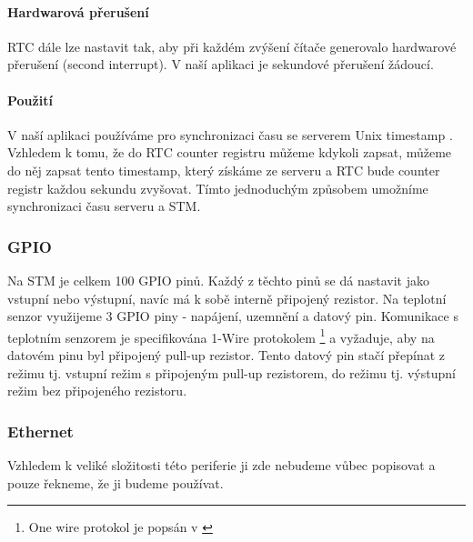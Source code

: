 \paragraph{Hardwarová přerušení}
RTC dále lze nastavit tak, aby při každém zvýšení čítače generovalo hardwarové
přerušení (second interrupt).
V naší aplikaci je sekundové přerušení žádoucí.

\paragraph{Použití}
V naší aplikaci používáme pro synchronizaci času se serverem Unix timestamp \cite{Unix-timestamp}.
Vzhledem k tomu, že do RTC counter registru můžeme kdykoli zapsat, můžeme do něj zapsat tento timestamp, který
získáme ze serveru a RTC bude counter registr každou sekundu zvyšovat.
Tímto jednoduchým způsobem umožníme synchronizaci času serveru a STM.

\subsubsection{GPIO}
Na STM je celkem 100 GPIO pinů.
Každý z těchto pinů se dá nastavit jako vstupní nebo výstupní, navíc má k sobě interně připojený
rezistor.
Na teplotní senzor využijeme 3 GPIO piny - napájení, uzemnění a datový pin.
Komunikace s teplotním senzorem je specifikována 1-Wire protokolem
\footnote{One wire protokol je popsán v \cite{DS18B20}} a vyžaduje, aby na datovém pinu byl připojený pull-up rezistor.
Tento datový pin stačí přepínat z režimu  tj. vstupní režim s připojeným pull-up
rezistorem, do režimu  tj. výstupní režim bez připojeného rezistoru.

\subsubsection{Ethernet}
Vzhledem k veliké složitosti této periferie ji zde nebudeme vůbec popisovat a pouze řekneme, že ji
budeme používat.
